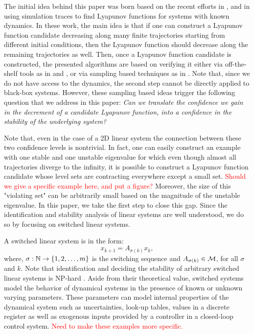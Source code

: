 The initial idea behind this paper was born based on the recent efforts in \cite{topcu}, \cite{kapinski} and \cite{lazar} in using simulation traces to find Lyapunov functions for systems with known dynamics. In these work, the main idea is that if one can construct a Lyapunov function candidate decreasing along many finite trajectories starting from different initial conditions, then the Lyapunov function should decrease along the remaining trajectories as well. Then, once a Lyapunov function candidate is constructed, the presented algorithms are based on verifying it either via off-the-shelf tools as in \cite{topcu} and \cite{kapinski}, or via sampling based techniques as in \cite{lazar}. Note that, since we do not have access to the dynamics, the second step cannot be directly applied to black-box systems. However, these sampling based ideas trigger the following question that we address in this paper: \emph{Can we translate the confidence we gain in the decrement of a candidate Lyapunov function, into a confidence in the stability of the underlying system?} 

Note that, even in the case of a 2D linear system the connection between these two confidence levels is nontrivial. In fact, one can easily construct an example with one stable and one unstable eigenvalue for which even though almost all trajectories diverge to the infinity, it is possible to construct a Lyapunov function candidate whose level sets are contracting everywhere except a small set. \textcolor{red}{Should we give a specific example here, and put a figure?} Moreover, the size of this "violating set" can be arbitrarily small based on the magnitude of the unstable eigenvalue. In this paper, we take the first step to close this gap. Since the identification and stability analysis of linear systems are well understood, we do so by focusing on switched linear systems.

A switched linear system is in the form:
\begin{equation}\label{eq:switchedSystem}x_{k+1} = A_{\sigma(k)}x_k,\end{equation}
where, $\sigma: \mathbb{N} \to \{1,2, \ldots, m\}$ is the switching sequence and $A_{\sigma(k)} \in \mathcal{M}$, for all $\sigma$ and $k$. Note that identification and deciding the stability of arbitrary switched linear systems is NP-hard \cite{jungersBook}. Aside from their theoretical value, switched systems model the behavior of dynamical systems in the presence of known or unknown varying parameters. These parameters can model internal properties of the dynamical system such as uncertainties, look-up tables, values in a discrete register as well as exogenous inputs provided by a controller in a closed-loop control system. \textcolor{red}{Need to make these examples more specific.}

